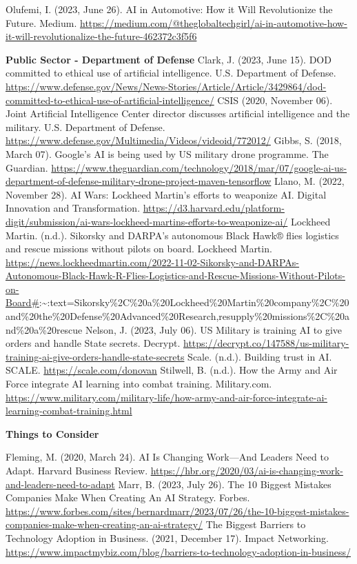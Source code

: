 \documentclass[
]{article}
\begin{document}
Olufemi, I. (2023, June 26). AI in Automotive: How it Will Revolutionize the Future. Medium. \url{https://medium.com/@theglobaltechgirl/ai-in-automotive-how-it-will-revolutionalize-the-future-462372c3f5f6}

\textbf{Public Sector - Department of Defense}
Clark, J. (2023, June 15). DOD committed to ethical use of artificial intelligence. U.S. Department of Defense. \url{https://www.defense.gov/News/News-Stories/Article/Article/3429864/dod-committed-to-ethical-use-of-artificial-intelligence/}
CSIS (2020, November 06). Joint Artificial Intelligence Center director discusses artificial intelligence and the military. U.S. Department of Defense. \url{https://www.defense.gov/Multimedia/Videos/videoid/772012/}
Gibbs, S. (2018, March 07). Google's AI is being used by US military drone programme. The Guardian. \url{https://www.theguardian.com/technology/2018/mar/07/google-ai-us-department-of-defense-military-drone-project-maven-tensorflow}
Llano, M. (2022, November 28). AI Wars: Lockheed Martin's efforts to weaponize AI. Digital Innovation and Transformation. \url{https://d3.harvard.edu/platform-digit/submission/ai-wars-lockheed-martins-efforts-to-weaponize-ai/}
Lockheed Martin. (n.d.). Sikorsky and DARPA's autonomous Black Hawk® flies logistics and rescue missions without pilots on board. Lockheed Martin. \url{https://news.lockheedmartin.com/2022-11-02-Sikorsky-and-DARPAs-Autonomous-Black-Hawk-R-Flies-Logistics-and-Rescue-Missions-Without-Pilots-on-Board\#}:\textasciitilde:text=Sikorsky\%2C\%20a\%20Lockheed\%20Martin\%20company\%2C\%20and\%20the\%20Defense\%20Advanced\%20Research,resupply\%20missions\%2C\%20and\%20a\%20rescue
Nelson, J. (2023, July 06). US Military is training AI to give orders and handle State secrets. Decrypt. \url{https://decrypt.co/147588/us-military-training-ai-give-orders-handle-state-secrets}
Scale. (n.d.). Building trust in AI. SCALE. \url{https://scale.com/donovan}
Stilwell, B. (n.d.). How the Army and Air Force integrate AI learning into combat training. Military.com. \url{https://www.military.com/military-life/how-army-and-air-force-integrate-ai-learning-combat-training.html}

\textbf{Things to Consider}

Fleming, M. (2020, March 24). AI Is Changing Work---And Leaders Need to Adapt. Harvard Business Review. \url{https://hbr.org/2020/03/ai-is-changing-work-and-leaders-need-to-adapt}
Marr, B. (2023, July 26). The 10 Biggest Mistakes Companies Make When Creating An AI Strategy. Forbes. \url{https://www.forbes.com/sites/bernardmarr/2023/07/26/the-10-biggest-mistakes-companies-make-when-creating-an-ai-strategy/}
The Biggest Barriers to Technology Adoption in Business. (2021, December 17). Impact Networking. \url{https://www.impactmybiz.com/blog/barriers-to-technology-adoption-in-business/}
\end{document}
